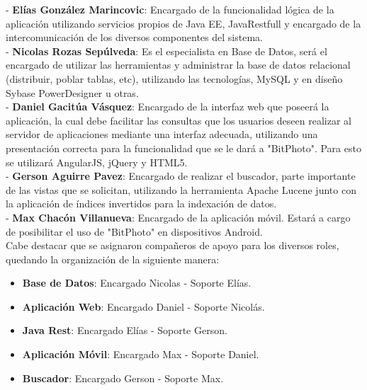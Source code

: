 \documentclass{memoria}
\begin{document}


- \textbf{Elías González Marincovic}: Encargado de la funcionalidad lógica de la aplicación utilizando servicios propios de Java EE, JavaRestfull y encargado de la intercomunicación de los diversos componentes del sistema.\\

- \textbf{Nicolas Rozas Sepúlveda}: Es el especialista en Base de Datos, será el encargado de utilizar las herramientas y administrar la base de datos relacional (distribuir, poblar tablas, etc), utilizando las tecnologías, MySQL y en diseño Sybase PowerDesigner u otras.\\

- \textbf{Daniel Gacitúa Vásquez}: Encargado de la interfaz web que poseerá la aplicación, la cual debe  facilitar las consultas que los usuarios deseen realizar al servidor de aplicaciones mediante una interfaz adecuada, utilizando una presentación correcta para la funcionalidad que se le dará a "BitPhoto". Para esto se utilizará AngularJS, jQuery y HTML5.\\

- \textbf{Gerson Aguirre Pavez}: Encargado de realizar el buscador, parte importante de las vistas que se solicitan, utilizando la herramienta Apache Lucene junto con la aplicación de índices invertidos para la indexación de datos.\\

- \textbf{Max Chacón Villanueva}: Encargado de la aplicación móvil. Estará a cargo de posibilitar el uso de "BitPhoto" en dispositivos Android.\\


Cabe destacar que se asignaron compañeros de apoyo para los diversos roles, quedando la organización de la siguiente manera:

\begin{itemize}
	\item \textbf{Base de Datos}: Encargado Nicolas - Soporte Elías.
	\item \textbf{Aplicación Web}: Encargado Daniel - Soporte Nicolás.
	\item \textbf{Java Rest}: Encargado Elías - Soporte Gerson.
	\item \textbf{Aplicación Móvil}: Encargado Max - Soporte Daniel.
	\item \textbf{Buscador}: Encargado Gerson - Soporte Max.
\end{itemize}
\end{document}
